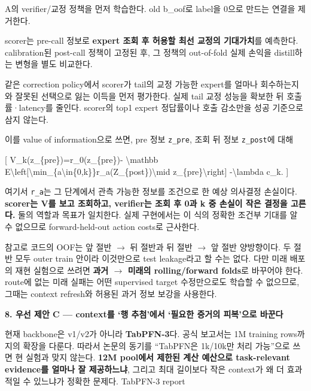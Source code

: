 \par\noindent \textbullet\enspace A의 verifier/\allowbreak{}교정 정책을 먼저 학습한다. old b\_\allowbreak{}oof로 label을 0으로 만드는 연결을 제거한다.


\par\noindent \textbullet\enspace scorer는 pre-call 정보로 \textbf{expert 조회 후 허용할 최선 교정의 기대가치}를 예측한다. calibration된 post-call 정책이 고정된 후, 그 정책의 out-of-fold 실제 손익을 distill하는 변형을 별도 비교한다.


\par\noindent \textbullet\enspace 같은 correction policy에서 scorer가 tail의 교정 가능한 expert를 얼마나 회수하는지와 잘못된 선택으로 잃는 이득을 먼저 평가한다. 실제 tail 교정 성능을 확보한 뒤 호출률·latency를 줄인다. scorer의 top1 expert 정답률이나 호출 감소만을 성공 기준으로 삼지 않는다.


이를 value of information으로 쓰면, pre 정보 \texttt{z\_\allowbreak{}\allowbreak{}pre}, 조회 뒤 정보 \texttt{z\_\allowbreak{}\allowbreak{}post}에 대해

[ V\_\allowbreak{}k(z\_\allowbreak{}\{pre\})=\allowbreak{}r\_\allowbreak{}0(z\_\allowbreak{}\{pre\})- \textbackslash{}mathbb E\textbackslash{}left[\textbackslash{}min\_\allowbreak{}\{a\textbackslash{}in\{0,k\}\}r\_\allowbreak{}a(Z\_\allowbreak{}\{post\})\textbackslash{}mid z\_\allowbreak{}\{pre\}\textbackslash{}right] -\textbackslash{}lambda c\_\allowbreak{}k. ]

여기서 \texttt{r\_\allowbreak{}\allowbreak{}a}는 그 단계에서 관측 가능한 정보를 조건으로 한 예상 의사결정 손실이다. \textbf{scorer는 V를 보고 조회하고, verifier는 조회 후 0과 k 중 손실이 작은 결정을 고른다.} 둘의 역할과 목표가 일치한다. 실제 구현에서는 이 식의 정확한 조건부 기대를 알 수 없으므로 forward-held-out action costs로 근사한다.

참고로 코드의 OOF는 앞 절반 \ensuremath{\rightarrow} 뒤 절반과 뒤 절반 \ensuremath{\rightarrow} 앞 절반 양방향이다. 두 절반 모두 outer train 안이라 이것만으로 test leakage라고 할 수는 없다. 다만 미래 배포의 재현 실험으로 쓰려면 \textbf{과거 \ensuremath{\rightarrow} 미래의 rolling/\allowbreak{}forward folds}로 바꾸어야 한다. route에 없는 미래 실패는 어떤 supervised target 수정만으로도 학습할 수 없으므로, 그때는 context refresh와 허용된 과거 정보 보강을 사용한다.

\textbf{8. 우선 제안 C — context를 ‘행 추첨’에서 ‘필요한 증거의 피복’으로 바꾼다}

현재 backbone은 v1/\allowbreak{}v2가 아니라 \textbf{TabPFN-3}다. 공식 보고서는 1M training rows까지의 확장을 다룬다. 따라서 논문의 동기를 “TabPFN은 1k/\allowbreak{}10k만 처리 가능”으로 쓰면 현 실험과 맞지 않는다. \textbf{12M pool에서 제한된 계산 예산으로 task-relevant evidence를 얼마나 잘 제공하느냐}, 그리고 최대 길이보다 작은 context가 왜 더 효과적일 수 있느냐가 정확한 문제다. TabPFN-3 report

